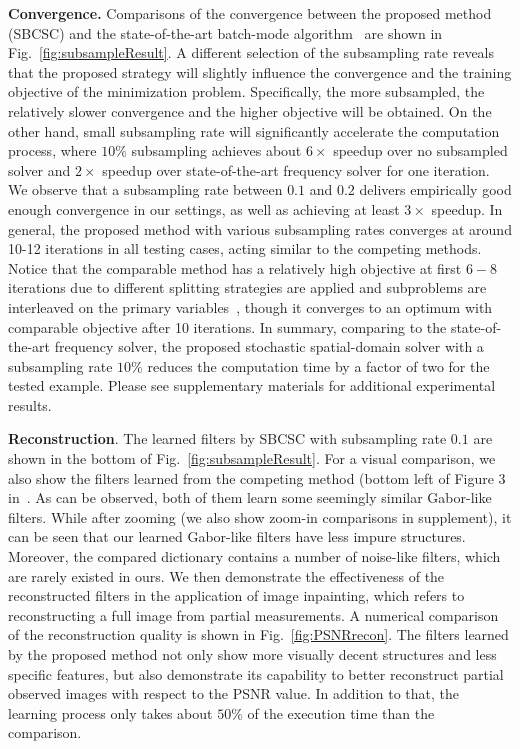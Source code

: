 {\bfseries Convergence.} Comparisons of the convergence between the proposed method (SBCSC) and the state-of-the-art batch-mode algorithm~\cite{heide2015fast} are shown in Fig.\ \ref{fig:subsampleResult}. A different selection of the subsampling rate reveals that the proposed strategy will slightly influence the convergence and the training objective of the minimization problem. Specifically, the more subsampled, the relatively slower convergence and the higher objective will be obtained. On the other hand, small subsampling rate will significantly accelerate the computation process, where $10\%$ subsampling achieves about $6 \times$ speedup over no subsampled solver and $2 \times$ speedup over state-of-the-art frequency solver for one iteration. We observe that a subsampling rate between $0.1$ and $0.2$ delivers empirically good enough convergence in our settings, as well as achieving at least $3 \times$ speedup. In general, the proposed method with various subsampling rates converges at around 10-12 iterations in all testing cases, acting similar to the competing methods. Notice that the comparable method has a relatively high objective at first $6-8$ iterations due to different splitting strategies are applied and subproblems are interleaved on the primary variables~\cite{wohlberg2016efficient}, though it converges to an optimum with comparable objective after 10 iterations. In summary, comparing to the state-of-the-art frequency solver, the proposed stochastic spatial-domain solver with a subsampling rate $10\%$ reduces the computation time by a factor of two for the tested example. Please see supplementary materials for additional experimental results.

{\bfseries Reconstruction}. The learned filters by SBCSC with subsampling rate $0.1$ are shown in the bottom of Fig.\ \ref{fig:subsampleResult}. For a visual comparison, we also show the filters learned from the competing method (bottom left of Figure 3 in~\cite{heide2015fast}. As can be observed, both of them learn some seemingly similar Gabor-like filters. While after zooming (we also show zoom-in comparisons in supplement), it can be seen that our learned Gabor-like filters have less impure structures. Moreover, the compared dictionary contains a number of noise-like filters, which are rarely existed in ours. We then demonstrate the effectiveness of the reconstructed filters in the application of image inpainting, which refers to reconstructing a full image from partial measurements. A numerical comparison of the reconstruction quality is shown in Fig.\ \ref{fig:PSNRrecon}. The filters learned by the proposed method not only show more visually decent structures and less specific features, but also demonstrate its capability to better reconstruct partial observed images with respect to the PSNR value. In addition to that, the learning process only takes about $50\%$ of the execution time than the comparison.

